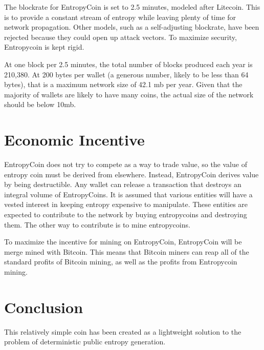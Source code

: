 \documentclass[twocolumn]{article}
\begin{document}
The blockrate for EntropyCoin is set to 2.5 minutes, modeled after Litecoin.
This is to provide a constant stream of entropy while leaving plenty of time for network propagation.
Other models, such as a self-adjusting blockrate, have been rejected because they could open up attack vectors.
To maximize security, Entropycoin is kept rigid.

At one block per 2.5 minutes, the total number of blocks produced each year is 210,380.
At 200 bytes per wallet (a generous number, likely to be less than 64 bytes), that is a maximum network size of 42.1 mb per year.
Given that the majority of wallets are likely to have many coins, the actual size of the network should be below 10mb.

\section{Economic Incentive}
EntropyCoin does not try to compete as a way to trade value, so the value of entropy coin must be derived from elsewhere.
Instead, EntropyCoin derives value by being destructible.
Any wallet can release a transaction that destroys an integral volume of EntropyCoins.
It is assumed that various entities will have a vested interest in keeping entropy expensive to manipulate.
These entities are expected to contribute to the network by buying entropycoins and destroying them.
The other way to contribute is to mine entropycoins.

To maximize the incentive for mining on EntropyCoin, EntropyCoin will be merge mined with Bitcoin.
This means that Bitcoin miners can reap all of the standard profits of Bitcoin mining, as well as the profits from Entropycoin mining.

\section{Conclusion}
This relatively simple coin has been created as a lightweight solution to the problem of deterministic public entropy generation.
\end{document}
